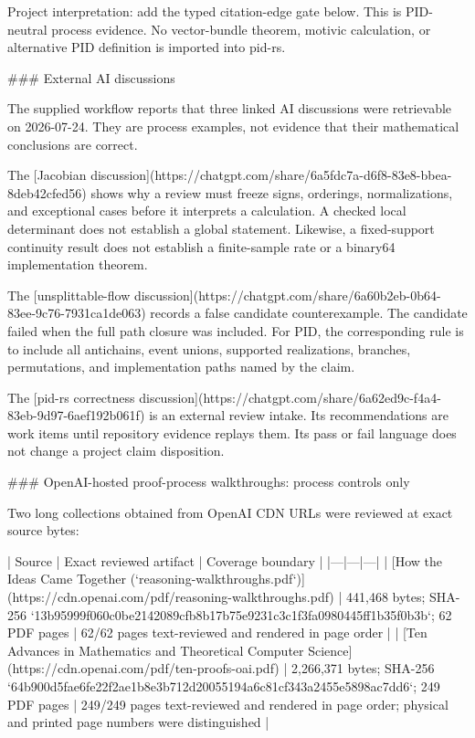 \documentclass[11pt]{article}
\begin{document}
\begin{markdown}
Project interpretation: add the typed citation-edge gate below. This is PID-neutral process
evidence. No vector-bundle theorem, motivic calculation, or alternative PID definition is imported
into pid-rs.

### External AI discussions

The supplied workflow reports that three linked AI discussions were retrievable on 2026-07-24.
They are process examples, not evidence that their mathematical conclusions are correct.

The
[Jacobian discussion](https://chatgpt.com/share/6a5fdc7a-d6f8-83e8-bbea-8deb42cfed56)
shows why a review must freeze signs, orderings, normalizations, and exceptional cases before it
interprets a calculation. A checked local determinant does not establish a global statement.
Likewise, a fixed-support continuity result does not establish a finite-sample rate or a binary64
implementation theorem.

The
[unsplittable-flow discussion](https://chatgpt.com/share/6a60b2eb-0b64-83ee-9c76-7931ca1de063)
records a false candidate counterexample. The candidate failed when the full path closure was
included. For PID, the corresponding rule is to include all antichains, event unions, supported
realizations, branches, permutations, and implementation paths named by the claim.

The
[pid-rs correctness discussion](https://chatgpt.com/share/6a62ed9c-f4a4-83eb-9d97-6aef192b061f)
is an external review intake. Its recommendations are work items until repository evidence replays
them. Its pass or fail language does not change a project claim disposition.

### OpenAI-hosted proof-process walkthroughs: process controls only

Two long collections obtained from OpenAI CDN URLs were reviewed at exact source bytes:

| Source | Exact reviewed artifact | Coverage boundary |
|---|---|---|
| [How the Ideas Came Together (`reasoning-walkthroughs.pdf`)](https://cdn.openai.com/pdf/reasoning-walkthroughs.pdf) | 441,468 bytes; SHA-256 `13b95999f060c0be2142089cfb8b17b75e9231c3c1f3fa0980445ff1b35f0b3b`; 62 PDF pages | 62/62 pages text-reviewed and rendered in page order |
| [Ten Advances in Mathematics and Theoretical Computer Science](https://cdn.openai.com/pdf/ten-proofs-oai.pdf) | 2,266,371 bytes; SHA-256 `64b900d5fae6fe22f2ae1b8e3b712d20055194a6c81cf343a2455e5898ac7dd6`; 249 PDF pages | 249/249 pages text-reviewed and rendered in page order; physical and printed page numbers were distinguished |


\end{markdown}
\end{document}
